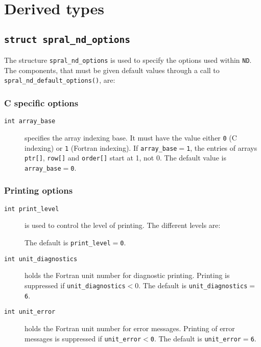 
\section{Derived types}
\subsection{\texttt{struct spral\_nd\_options}}
\label{nd:type:options}

The structure {\tt spral\_nd\_options} is used to specify the options used
within \texttt{ND}. The components, that must be given default values through a
call to \texttt{spral\_nd\_default\_options()}, are: \\


\subsubsection*{C specific options}
\begin{description}
\item[\texttt{int array\_base}] specifies the array indexing base. It must
   have the value either \texttt{0} (C indexing) or \texttt{1} (Fortran
   indexing). If \texttt{array\_base}$=$\texttt{1}, the entries of arrays
   \texttt{ptr[]}, \texttt{row[]} and \texttt{order[]} start at 1, not 0.
   The default value is \texttt{array\_base}$=$\texttt{0}.
\end{description}

\subsubsection*{Printing options}

\begin{description}

\item[\texttt{int print\_level}] is used to control the level of printing.
The different levels are:
The default is {\tt print\_level$=$\tt 0}.

\item[\texttt{int unit\_diagnostics}] holds the Fortran
unit number for diagnostic printing. Printing is suppressed if
{\tt unit\_diagnostics$<0$}.
The default is {\tt unit\_diagnostics$=$6}.

\item[\texttt{int unit\_error}] holds the Fortran
unit number for error messages.
Printing of error messages
is suppressed if {\tt unit\_error$<$0}.
The default is {\tt unit\_error$=$6}.

\end{description}



